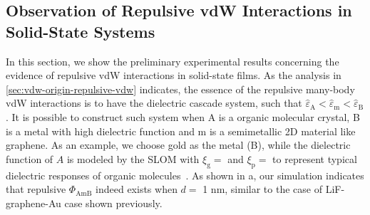 
\subsection{Observation of Repulsive vdW Interactions in Solid-State Systems}
\label{sec:vdw-observ-repuls-vdw}


In this section, we show the preliminary experimental results
concerning the evidence of repulsive vdW interactions in solid-state
films.
%
As the analysis in \autoref{sec:vdw-origin-repulsive-vdw} indicates,
the essence of the repulsive many-body vdW interactions is to have the
dielectric cascade system, such that
$\hat{\varepsilon}_{\mathrm{A}} < \hat{\varepsilon}_{\mathrm{m}} <
\hat{\varepsilon}_{\mathrm{B}}$.
%
It is possible to construct such system when A is a organic molecular
crystal, B is a metal with high dielectric function and m is a
semi\-metallic 2D material like graphene.
%
As an example, we choose gold as the metal (B), while the dielectric
function of $A$ is modeled by the SLOM with $\xi_{\mathrm{g}}=$
 and $\xi_{\mathrm{p}}=$  to represent
typical dielectric responses of organic molecules~.
%
As shown in a, our simulation indicates that
repulsive $\Phi_{\mathrm{AmB}}$ indeed exists when $d=$ 1
nm, similar to the case of LiF-graphene-Au
case shown previously.
%

